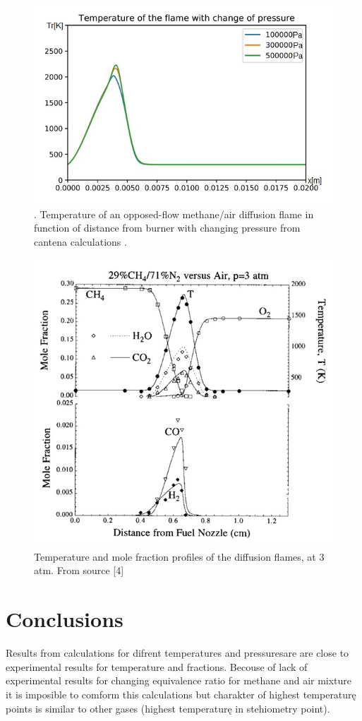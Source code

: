 \documentclass[a4paper]{article}
\begin{document}
\begin{figure}
\includegraphics[width=1\textwidth]{4.jpg}
\caption{\label{fig:4}. Temperature of an opposed-flow methane/air diffusion flame in function of distance from burner with changing pressure from cantena calculations .}
\end{figure}

\begin{figure}
\includegraphics[width=1\textwidth]{5.jpg}
\caption{\label{fig:5}Temperature and mole fraction profiles of the diffusion flames, at 3 atm. From source [4]}
\end{figure}
\section{Conclusions}
Results from calculations for difrent temperatures and pressuresare are close to experimental results for temperature and fractions. Becouse of lack of experimental results for changing equivalence ratio for methane and air mixture it is imposible to comform this calculations but charakter of highest temperaturę points is similar to other gases (highest temperaturę in stehiometry point).
\end{document}
